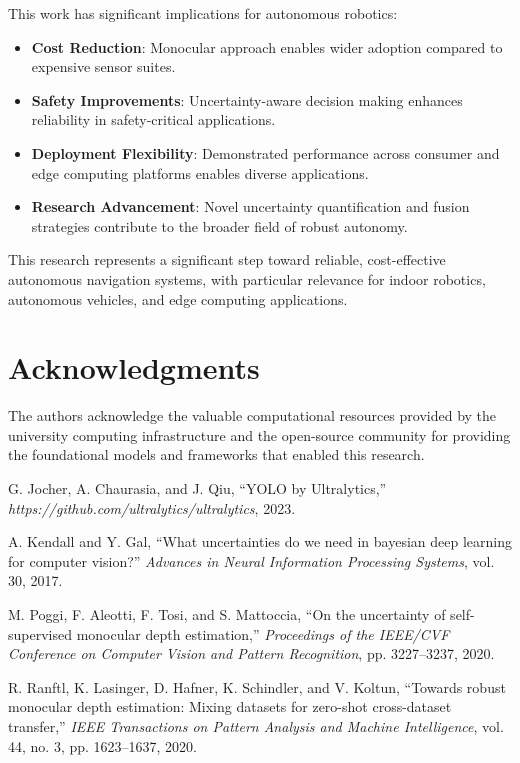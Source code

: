 \documentclass[12pt]{article}
\begin{document}
This work has significant implications for autonomous robotics:

\begin{itemize}
\item \textbf{Cost Reduction}: Monocular approach enables wider adoption compared to expensive sensor suites.

\item \textbf{Safety Improvements}: Uncertainty-aware decision making enhances reliability in safety-critical applications.

\item \textbf{Deployment Flexibility}: Demonstrated performance across consumer and edge computing platforms enables diverse applications.

\item \textbf{Research Advancement}: Novel uncertainty quantification and fusion strategies contribute to the broader field of robust autonomy.
\end{itemize}

This research represents a significant step toward reliable, cost-effective autonomous navigation systems, with particular relevance for indoor robotics, autonomous vehicles, and edge computing applications.

\section*{Acknowledgments}

The authors acknowledge the valuable computational resources provided by the university computing infrastructure and the open-source community for providing the foundational models and frameworks that enabled this research.

\begin{thebibliography}{99}

G. Jocher, A. Chaurasia, and J. Qiu,
``YOLO by Ultralytics,''
\emph{https://github.com/ultralytics/ultralytics}, 2023.

A. Kendall and Y. Gal,
``What uncertainties do we need in bayesian deep learning for computer vision?''
\emph{Advances in Neural Information Processing Systems}, vol. 30, 2017.

M. Poggi, F. Aleotti, F. Tosi, and S. Mattoccia,
``On the uncertainty of self-supervised monocular depth estimation,''
\emph{Proceedings of the IEEE/CVF Conference on Computer Vision and Pattern Recognition}, pp. 3227--3237, 2020.

R. Ranftl, K. Lasinger, D. Hafner, K. Schindler, and V. Koltun,
``Towards robust monocular depth estimation: Mixing datasets for zero-shot cross-dataset transfer,''
\emph{IEEE Transactions on Pattern Analysis and Machine Intelligence}, vol. 44, no. 3, pp. 1623--1637, 2020.

\end{thebibliography}
\end{document}
